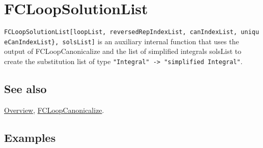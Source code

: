 \documentclass[../FeynCalcManual.tex]{subfiles}
\begin{document}
\hypertarget{fcloopsolutionlist}{%
\section{FCLoopSolutionList}\label{fcloopsolutionlist}}

\texttt{FCLoopSolutionList[\allowbreak{}loopList,\ \allowbreak{}reversedRepIndexList,\ \allowbreak{}canIndexList,\ \allowbreak{}uniqueCanIndexList\},\ \allowbreak{}solsList]}
is an auxiliary internal function that uses the output of
FCLoopCanonicalize and the list of simplified integrals solsList to
create the substitution list of type
\texttt{"Integral" -> "simplified Integral"}.

\subsection{See also}

\hyperlink{toc}{Overview},
\hyperlink{fcloopcanonicalize}{FCLoopCanonicalize}.

\subsection{Examples}

\begin{Shaded}
\begin{Highlighting}[]
\ExtensionTok{=}\OperatorTok{[}\OperatorTok{[}\OperatorTok{[}\OperatorTok{,} \SpecialCharTok{\textbackslash{}}\OperatorTok{[}\OperatorTok{]]}\OperatorTok{[}\OperatorTok{,} \SpecialCharTok{\textbackslash{}}\OperatorTok{[}\OperatorTok{]]}\OperatorTok{[}\OperatorTok{,} \OperatorTok{\{} \SpecialCharTok{+} \OperatorTok{,} \OperatorTok{\}]]} \SpecialCharTok{+}\OperatorTok{[}\OperatorTok{[}\OperatorTok{,} \SpecialCharTok{\textbackslash{}}\OperatorTok{[}\OperatorTok{]]}\OperatorTok{[}\OperatorTok{,} \SpecialCharTok{\textbackslash{}}\OperatorTok{[}\OperatorTok{]]}\OperatorTok{[}\OperatorTok{,} \OperatorTok{\{} \SpecialCharTok{+} \OperatorTok{,} \OperatorTok{\}]],} \OperatorTok{,}\OperatorTok{]} 
\end{Highlighting}
\end{Shaded}
\end{document}
